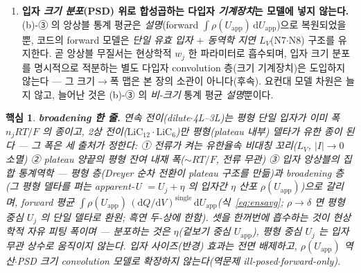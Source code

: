 \documentclass[11pt,a4paper]{article}
\newtheorem*{keybox}{핵심}
\newcommand{\dd}{\mathrm{d}}
\newcommand{\app}{\mathrm{app}}
\begin{document}
\begin{enumerate}[label=(\roman*),leftmargin=2.2em,itemsep=2.5pt]
일관하므로\cite{park2021}(풀셀 OCP 는 시사, 단일입자 확정 아님), 분포하는 것은 그 중심이 아니라 겉보기 전위의 폭 $\rho(U_\app)$ 곧 과전압 $\eta$ 의
산포다(분포는 폭을 \emph{넓힐} 뿐 평형 중심 $U_j$ 를 옮기지 않는다).
\item \textbf{입자 \emph{크기 분포}(PSD) 위로 합성곱하는 다입자 \emph{기계장치}는 모델에 넣지 않는다.} (b)-③ 의 앙상블
통계 평균은 \emph{설명}(forward $\int\rho(U_\app)\,\dd U_\app$)으로 복원되었을 뿐, 코드의 forward 모델은 \emph{단일
유효 입자 $+$ 동역학 지연 $L_V$}(N7$\cdot$N8) 구조를 유지한다. 곧 앙상블 무질서는 현상학적 $w_j$ 한 파라미터로 흡수되며,
입자 크기 분포를 명시적으로 적분하는 별도 다입자 convolution 층(크기 기계장치)은 도입하지 않는다 — 그 크기$\to$폭 맵은
본 장의 소관이 아니다(후속). 요컨대 모델 차원은 늘지 않고, 늘어난 것은 (b)-③ 의 \emph{비-크기} 통계 평균 \emph{설명}뿐이다.
\end{enumerate}

\begin{keybox}
\textbf{broadening 한 줄.} 연속 전이(dilute$\cdot$4L--3L)는 평형 단일 입자가 \emph{이미} 폭 $n_jRT/F$ 의 종이고,
2상 전이($\mathrm{LiC_{12}}\cdot\mathrm{LiC_6}$)만 평형(plateau 내부) 델타가 유한 종이 된다 — 그 폭은 \emph{세}
출처가 정한다: ① \emph{전류가 켜는} 유한율속 비대칭 꼬리($L_V$, $|I|\!\to\!0$ 소멸) ② plateau 양끝의 \emph{평형 잔여}
내재 폭($\sim RT/F$, 전류 무관) ③ \emph{입자 앙상블}의 집합 통계역학 — 평형 층(Dreyer 순차 전환이 \emph{plateau 구조}를
만듦)과 broadening 층(그 평형 델타를 펴는 \emph{apparent-U $=U_j+\eta$} 의 입자간 $\eta$ 산포 $\rho(U_\app)$)으로 갈리며,
forward 평균 $\int\rho(U_\app)\,(\dd Q/\dd V)^\mathrm{single}\,\dd U_\app$(식~\eqref{eq:ensavg}; $\rho\!\to\!\delta$ 면
평형 중심 $U_j$ 의 단일 델타로 환원; 흑연 두-상에 한함). 셋을 한꺼번에 흡수하는 것이 \emph{현상학적 자유 피팅 폭}이며 —
\emph{분포하는 것은 $\eta$(겉보기 중심 $U_\app$), 평형 중심 $U_j$ 는 입자 무관 상수로 움직이지 않는다}. \emph{입자
사이즈(반경) 효과는 전면 배제}하고, $\rho(U_\app)$ 역산$\cdot$PSD 크기 convolution 모델로 확장하지 않는다(역문제
ill-posed$\cdot$forward-only).
\end{keybox}
\end{document}
